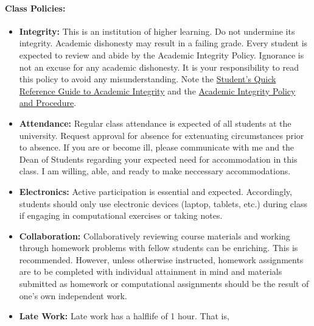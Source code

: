 \documentclass[11pt, a4paper]{article}
\begin{document}
\paragraph{Class Policies:}

\begin{itemize}
\item[] \textbf{Integrity:} This is an institution of higher learning.
        Do not undermine its integrity. Academic dishonesty may result in a failing grade. 
                Every student is expected to review and abide by the Academic 
                Integrity Policy. Ignorance is not an excuse for any academic 
                dishonesty. It is your responsibility to read this policy to 
                avoid any misunderstanding.  Note the 
                \href{https://provost.illinois.edu/policies/policies/academic-integrity/students-quick-reference-guide-to-academic-integrity/}{Student's 
                Quick Reference Guide to Academic Integrity} and the 
                \href{https://studentcode.illinois.edu/article1/part4/1-401/}{Academic 
                Integrity Policy and Procedure}.
\item[] \textbf{Attendance:} 
        Regular class attendance is expected of all students at the university. 
                Request approval for absence for extenuating circumstances 
                prior to absence.  If you are or become ill, please communicate 
                with me and the Dean of Students regarding your expected need 
                for accommodation in this class. I am willing, able, and ready 
                to make neccessary accommodations.
\item[] \textbf{Electronics:} 
        Active participation is essential and expected.
        Accordingly, students should only use electronic devices (laptop,
        tablets, etc.) during class if engaging in computational 
        exercises or taking notes.
\item[] \textbf{Collaboration:} Collaboratively reviewing course materials and 
        working through homework problems with fellow students can be 
                enriching.  This is recommended.  However, unless otherwise 
                instructed, homework assignments are to be completed with 
                individual attainment in mind and materials submitted as 
                homework or computational assignments should be the result of 
                one's own independent work.
\item[] \textbf{Late Work:} Late work has a halflife of 1 hour. That is, 

\end{itemize}
\end{document}
